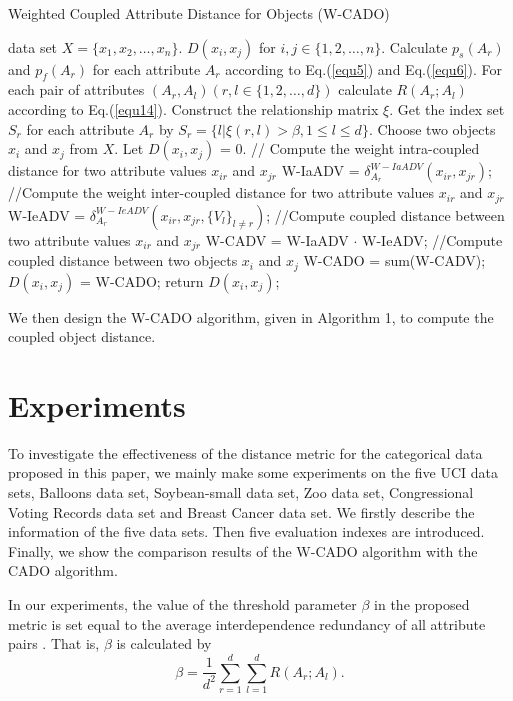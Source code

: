 \documentclass[review]{elsarticle}
\begin{document}
\begin{algorithm}[!ht]
  \caption{Weighted Coupled Attribute Distance for Objects (W-CADO)}
  \label{alg:Weight-CADO}
  \begin{algorithmic}[1]
    data set ${X = \{x_1,x_2,\dots,x_n\}}$.
    ${D(x_i,x_j)}$ for ${i,j \in \{1,2,\dots,n\}}$.
   \STATE Calculate ${p_s(A_r)}$ and ${p_f(A_r)}$ for each attribute ${A_r}$ according to Eq.(\ref{equ5}) and Eq.(\ref{equ6}).
   \STATE For each pair of attributes ${(A_r,A_l)(r,l \in \{1,2,\dots,d\})}$ calculate ${R(A_r;A_l)}$ according to Eq.(\ref{equ14}).
   \STATE Construct the relationship matrix ${\xi}$.
   \STATE Get the index set ${S_r}$ for each attribute ${A_r}$ by ${S_r = \{l|\xi(r,l) > \beta, 1 \leq l \leq d\}}$.
   \STATE Choose two objects ${x_i}$ and ${x_j}$ from ${X}$.
   \STATE Let ${D(x_i,x_j)}$ = 0.
   \STATE // Compute the weight intra-coupled distance for two attribute values $x_{ir}$ and $x_{jr}$
   \STATE W-IaADV = $\delta_{A_r}^{W-IaADV}(x_{ir},x_{jr})$;
   \STATE //Compute the weight inter-coupled distance for two attribute values $x_{ir}$ and $x_{jr}$
   \STATE W-IeADV = $\delta_{A_r}^{W-IeADV}(x_{ir},x_{jr},\{V_l\}_{l \neq r})$;
   \STATE //Compute coupled distance between two attribute values $x_{ir}$ and $x_{jr}$
   \STATE W-CADV = W-IaADV $\cdot$ W-IeADV;
   \STATE //Compute coupled distance between two objects $x_{i}$ and $x_{j}$
   \STATE W-CADO = sum(W-CADV);
   \ENDFOR
   \STATE ${D(x_i,x_j)}$ = W-CADO;
   \STATE return ${D(x_i,x_j)}$;
\end{algorithmic}
\end{algorithm}
We then design the W-CADO algorithm, given in Algorithm 1, to compute the coupled object distance.

\section{Experiments}
To investigate the effectiveness of the distance metric for the categorical data proposed in this paper, we mainly make some experiments on the five UCI data sets, Balloons data set, Soybean-small data set, Zoo data set, Congressional Voting Records data set and Breast Cancer data set. We firstly describe the information of the five data sets. Then five evaluation indexes are introduced. Finally, we show the comparison results of the W-CADO algorithm with the CADO algorithm.

In our experiments, the value of the threshold parameter $\beta$ in the proposed metric is set equal to the average interdependence redundancy of all attribute pairs \cite{Jia2014A}. That is, $\beta$ is calculated by
\begin{equation}
\beta = \frac{1}{d^2}\sum_{r=1}^{d}\sum_{l=1}^{d}R(A_r;A_l).
\label{equ22}
\end{equation}
\end{document}
